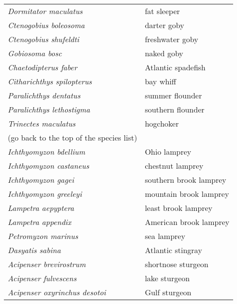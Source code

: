 \documentclass[11pt]{article}
\begin{document}
\begin{tabular}{@{}L{3in}L{3in}@{}}
\textit{Dormitator maculatus} &   fat sleeper\tabularnewline
\textit{Ctenogobius boleosoma} &   darter goby\tabularnewline
\textit{Ctenogobius shufeldti} &   freshwater goby\tabularnewline
\textit{Gobiosoma bosc} &   naked goby\tabularnewline
\textit{Chaetodipterus faber} &   Atlantic spadefish\tabularnewline
\textit{Citharichthys spilopterus} &   bay whiff\tabularnewline
\textit{Paralichthys dentatus} &   summer flounder\tabularnewline
\textit{Paralichthys lethostigma} &   southern flounder\tabularnewline
\textit{Trinectes maculatus} &   hogchoker\tabularnewline[0.5ex]
(go back to the top of the species list) &  \tabularnewline
\textit{Ichthyomyzon bdellium} &   Ohio lamprey\tabularnewline
\textit{Ichthyomyzon castaneus} &   chestnut lamprey\tabularnewline
\textit{Ichthyomyzon gagei} &   southern brook lamprey\tabularnewline
\textit{Ichthyomyzon greeleyi} &   mountain brook lamprey\tabularnewline
\textit{Lampetra aepyptera} &   least brook lamprey\tabularnewline
\textit{Lampetra appendix} &   American brook lamprey\tabularnewline
\textit{Petromyzon marinus} &   sea lamprey\tabularnewline
\textit{Dasyatis sabina} &   Atlantic stingray\tabularnewline
\textit{Acipenser brevirostrum} &   shortnose sturgeon\tabularnewline
\textit{Acipenser fulvescens} &   lake sturgeon\tabularnewline
\textit{Acipenser oxyrinchus desotoi} &   Gulf sturgeon\tabularnewline
\end{tabular}
\end{document}
